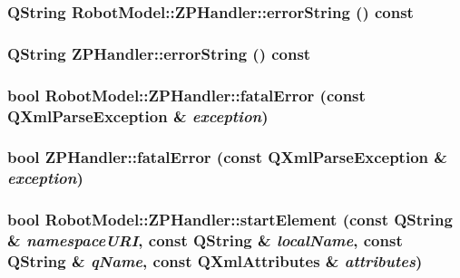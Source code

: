 \label{class_robot_model_1_1_z_p_handler_ab058af372b5178f8877907ee45b8257d}
\hypertarget{class_robot_model_1_1_z_p_handler_aefc7dde46f775b9fe6f30cf46d1b7b3c}{
\subsubsection[{errorString}]{\setlength{\rightskip}{0pt plus 5cm}QString RobotModel::ZPHandler::errorString () const}}
\label{class_robot_model_1_1_z_p_handler_aefc7dde46f775b9fe6f30cf46d1b7b3c}
\hypertarget{class_robot_model_1_1_z_p_handler_aca3c34530b327d635a4e915992f576de}{
\subsubsection[{errorString}]{\setlength{\rightskip}{0pt plus 5cm}QString ZPHandler::errorString () const}}
\label{class_robot_model_1_1_z_p_handler_aca3c34530b327d635a4e915992f576de}
\hypertarget{class_robot_model_1_1_z_p_handler_ad56355b01366e4d0cb9137ad094d1280}{
\subsubsection[{fatalError}]{\setlength{\rightskip}{0pt plus 5cm}bool RobotModel::ZPHandler::fatalError (const QXmlParseException \& {\em exception})}}
\label{class_robot_model_1_1_z_p_handler_ad56355b01366e4d0cb9137ad094d1280}
\hypertarget{class_robot_model_1_1_z_p_handler_a442f6837417a1baa0d60641ddd854109}{
\subsubsection[{fatalError}]{\setlength{\rightskip}{0pt plus 5cm}bool ZPHandler::fatalError (const QXmlParseException \& {\em exception})}}
\label{class_robot_model_1_1_z_p_handler_a442f6837417a1baa0d60641ddd854109}
\hypertarget{class_robot_model_1_1_z_p_handler_a5ed52c5d331fa5e54c41b905898fd936}{
\subsubsection[{startElement}]{\setlength{\rightskip}{0pt plus 5cm}bool RobotModel::ZPHandler::startElement (const QString \& {\em namespaceURI}, \/  const QString \& {\em localName}, \/  const QString \& {\em qName}, \/  const QXmlAttributes \& {\em attributes})}}
